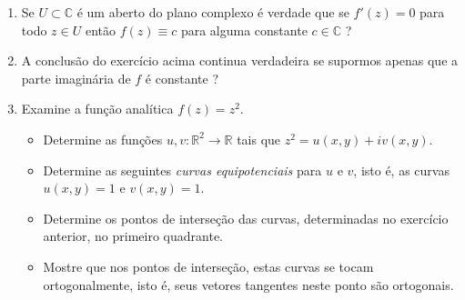 \begin{enumerate}[leftmargin=*]
	
	
	\item Se $U\subset\mathbb{C}$ é um aberto do plano complexo é verdade que se $f'(z)=0$ para todo $z\in U$ então 
	$f(z)\equiv c$ para alguma constante $c\in\mathbb{C}$ ?
	
	
	
	
	
	\item A conclusão do exercício acima continua verdadeira se supormos apenas que a parte imaginária 
	de $f$ é constante ?
	
	
	
	
	\item Examine a função analítica $f(z) = z^2$.
	
	\begin{itemize}
		\item Determine as funções $u,v:\mathbb{R}^2\to\mathbb{R}$ tais que
		$z^2=u(x,y)+iv(x,y)$.
		
		\item 	Determine as seguintes {\it curvas equipotenciais} para $u$ e $v$, isto é,  
		as curvas $u(x,y)=1$ e $v(x,y)=1$.
		
		\item 	Determine os pontos de interseção das curvas, determinadas no exercício anterior, 
		no primeiro quadrante.
		
		\item  Mostre que nos pontos de interseção, estas curvas se tocam ortogonalmente,
		isto é, seus vetores tangentes neste ponto são ortogonais.
	\end{itemize}
	
	
	
\end{enumerate}
